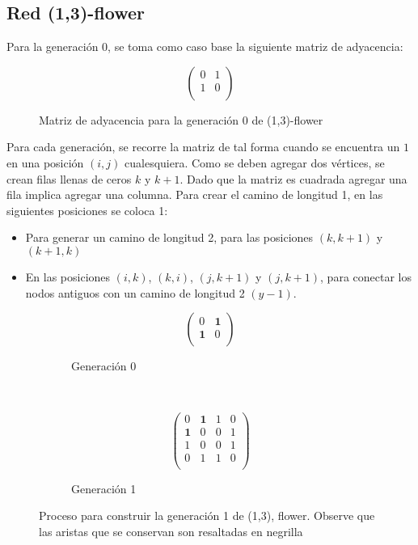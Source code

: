 \subsection{Red (1,3)-flower}

Para la generación 0, se toma como caso base la siguiente matriz de adyacencia:

\begin{figure}[H]
    \centering
\[ 
\left( \begin{array}{cc}
 0 & 1  \\ 
 1 & 0 \\
\end{array} \right)\]
\caption{Matriz de adyacencia para la generación 0 de (1,3)-flower}
\end{figure}

Para cada generación, se recorre la matriz de tal forma cuando se encuentra un $1$ en una posición $(i,j)$ cualesquiera. Como se deben agregar dos vértices, se crean filas llenas de ceros $k$ y $k+1$. Dado que la matriz es cuadrada agregar una fila implica agregar una columna. Para crear el camino de longitud 1, en las siguientes posiciones se coloca 1:

\begin{itemize}
    \item Para generar un camino de longitud 2, para las posiciones $(k,k+1)$ y $(k+1,k)$ 
    \item En las posiciones $(i,k)$, $(k,i)$, $(j,k+1)$ y $(j,k+1)$, para conectar los nodos antiguos con un camino de longitud 2 $(y-1)$.
\end{itemize}

\begin{figure}[H]
    \centering
     \begin{subfigure}[b]{0.25\textwidth}
\[ 
\left( \begin{array}{cc}
 0 & \textbf{1}  \\ 
\textbf{1} & 0 \\
\end{array} \right)\]
\caption{Generación 0}
 \end{subfigure}~ \begin{subfigure}[b]{0.25\textwidth}
 \[ \left( \begin{array}{cccc}
 0 & \textbf{1} & 1 & 0  \\ 
 \textbf{1} & 0 & 0 & 1\\
 1 & 0 & 0 & 1 \\
 0 & 1 & 1 & 0\\
\end{array} \right)\]
\caption{Generación 1}
     \end{subfigure}
    \caption{Proceso para construir la generación 1 de (1,3), flower. Observe que las aristas que se conservan son resaltadas en negrilla}
    \label{fig:redesfractales}
\end{figure}

